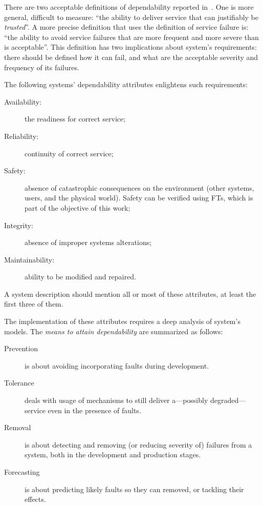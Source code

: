 There are two acceptable definitions of dependability reported in~\cite{ALR+2004}.
One is more general, difficult to measure: ``the ability to deliver service that can justifiably be \emph{trusted}''.
A more precise definition that uses the definition of service failure is: ``the ability to avoid service failures that are more frequent and more severe than is acceptable''.
This definition has two implications about system's requirements: there should be defined how it can fail, and what are the acceptable severity and frequency of its failures.

The following systems' dependability attributes enlightens such requirements:
\begin{description}
  \item[Availability:] the readiness for correct service;
  \item[Reliability:] continuity of correct service;
  \item[Safety:] absence of catastrophic consequences on the environment (other systems, users, and the physical world).
  Safety can be verified using \acp{FT}, which is part of the objective of this work;
  \item[Integrity:] absence of improper systems alterations;
  \item[Maintainability:] ability to be modified and repaired.
\end{description}
%
A system description should mention all or most of these attributes, at least the first three of them.

The implementation of these attributes requires a deep analysis of system's models.
The \emph{means to attain dependability} are summarized as follows:

\begin{description}
  \item[Prevention] is about avoiding incorporating faults during development.
  \item[Tolerance] deals with usage of mechanisms to still deliver a---possibly degraded---service even in the presence of faults.
  \item[Removal] is about detecting and removing (or reducing severity of) failures from a system, both in the development and production stages.
  \item[Forecasting] is about predicting likely faults so they can removed, or tackling their effects.
\end{description}

